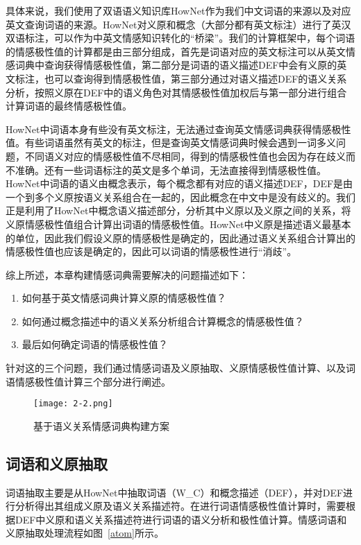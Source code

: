 具体来说，我们使用了双语语义知识库HowNet作为我们中文词语的来源以及对应英文查询词语的来源。HowNet对义原和概念（大部分都有英文标注）进行了英汉双语标注，可以作为中英文情感知识转化的“桥梁”。我们的计算框架中，每个词语的情感极性值的计算都是由三部分组成，首先是词语对应的英文标注可以从英文情感词典中查询获得情感极性值，第二部分是词语的语义描述DEF中会有义原的英文标注，也可以查询得到情感极性值，第三部分通过对语义描述DEF的语义关系分析，按照义原在DEF中的语义角色对其情感极性值加权后与第一部分进行组合计算词语的最终情感极性值。

HowNet中词语本身有些没有英文标注，无法通过查询英文情感词典获得情感极性值。有些词语虽然有英文的标注，但是查询英文情感词典时候会遇到一词多义问题，不同语义对应的情感极性值不尽相同，得到的情感极性值也会因为存在歧义而不准确。还有一些词语标注的英文是多个单词，无法直接得到情感极性值。HowNet中词语的语义由概念表示，每个概念都有对应的语义描述DEF，DEF是由一个到多个义原按语义关系组合在一起的，因此概念在中文中是没有歧义的。我们正是利用了HowNet中概念语义描述部分，分析其中义原以及义原之间的关系，将义原情感极性值组合计算出词语的情感极性值。HowNet中义原是描述语义最基本的单位，因此我们假设义原的情感极性是确定的，因此通过语义关系组合计算出的情感极性值也应该是确定的，因此可以词语的情感极性进行“消歧”。

综上所述，本章构建情感词典需要解决的问题描述如下：
\begin{enumerate}
\item 如何基于英文情感词典计算义原的情感极性值？
\item 如何通过概念描述中的语义关系分析组合计算概念的情感极性值？
\item 最后如何确定词语的情感极性值？
\end{enumerate}

针对这的三个问题，我们通过情感词语及义原抽取、义原情感极性值计算、以及词语情感极性值计算三个部分进行阐述。

\begin{landscape}
\begin{figure*}
\centering
\texttt{[image: 2-2.png]}
\caption{基于语义关系情感词典构建方案}
\label{frame}
\end{figure*}
\end{landscape}

\subsection{词语和义原抽取}
词语抽取主要是从HowNet中抽取词语（W\_C）和概念描述（DEF），并对DEF进行分析得出其组成义原及语义关系描述符。在进行词语情感极性值计算时，需要根据DEF中义原和语义关系描述符进行词语的语义分析和极性值计算。情感词语和义原抽取处理流程如图~\ref{atom}所示。

